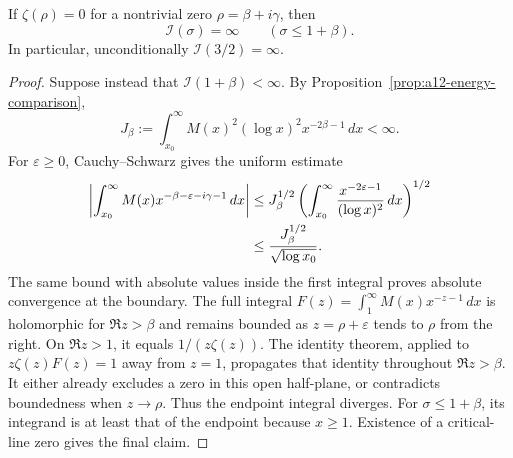 \begin{theorem}
\label{thm:a12-energy-zero}
If $\zeta(\rho)=0$ for a nontrivial zero $\rho=\beta+i\gamma$, then
\begin{equation}
\label{eq:a12-energy-zero}
\boxed{\mathcal I(\sigma)=\infty\qquad(\sigma\le1+\beta).}
\end{equation}
In particular, unconditionally $\mathcal I(3/2)=\infty$.
\end{theorem}
\begin{proof}
Suppose instead that $\mathcal I(1+\beta)<\infty$. By
Proposition~\ref{prop:a12-energy-comparison},
\begin{equation}
\label{eq:a12-Jbeta}
J_\beta:=\int_{x_0}^\infty
M(x)^2(\log x)^2x^{-2\beta-1}\,dx<\infty.
\end{equation}
For $\varepsilon\ge0$, Cauchy--Schwarz gives the uniform estimate
\begin{align}
\left|\int_{x_0}^\infty
M(x)x^{-\beta-\varepsilon-i\gamma-1}\,dx\right|
&\le J_\beta^{1/2}
\left(\int_{x_0}^\infty
\frac{x^{-2\varepsilon-1}}{(\log x)^2}\,dx\right)^{1/2}
\notag\\
&\le \frac{J_\beta^{1/2}}{\sqrt{\log x_0}}.
\label{eq:a12-energy-boundary-CS}
\end{align}
The same bound with absolute values inside the first integral proves
absolute convergence at the boundary. The full integral
$F(z)=\int_1^\infty M(x)x^{-z-1}\,dx$ is holomorphic for $\Re z>\beta$
and remains bounded as $z=\rho+\varepsilon$ tends to $\rho$ from the right.
On $\Re z>1$, it equals $1/(z\zeta(z))$. The identity theorem, applied to
$z\zeta(z)F(z)=1$ away from $z=1$, propagates that identity throughout
$\Re z>\beta$. It either already excludes a zero in this open half-plane,
or contradicts boundedness when $z\to\rho$.
Thus the endpoint integral diverges.
For $\sigma\le1+\beta$, its integrand is at least that of the endpoint
because $x\ge1$. Existence of a critical-line zero gives the final claim.
\end{proof}

